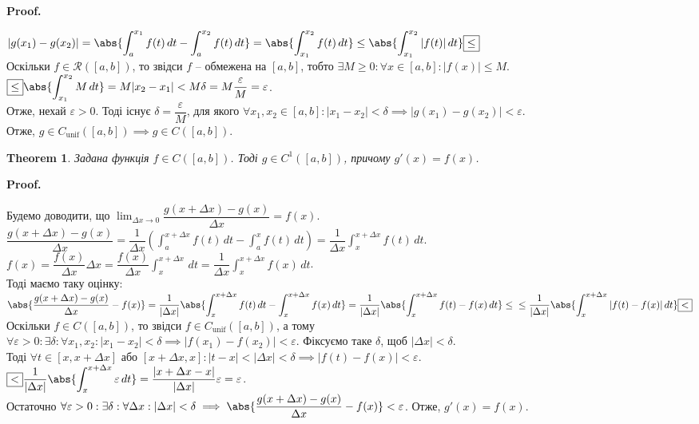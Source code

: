 \documentclass[a4paper, 10pt]{article}
\makeatletter
\def\huge{\displaystyle}
\theoremstyle{theoremdd}
\newtheorem{theorem}{Theorem}[subsection]
\theoremstyle{theoremdd}
\theoremstyle{theoremdd}
\theoremstyle{theoremdd}
\theoremstyle{theoremdd}
\theoremstyle{theoremdd}
\theoremstyle{theoremdd}
\theoremstyle{theoremdd}
\theoremstyle{theoremdd}
\renewenvironment{proof}[1][Proof.\\]{\par
\pushQED{\hfill \qed}%
\normalfont \topsep6\p@\@plus6\p@\relax
\trivlist
\item\relax
{\bfseries
#1\@addpunct{.}}\hspace\labelsep\ignorespaces
}{%
\popQED\endtrivlist\@endpefalse
}
\makeatother
\begin{document}
\begin{proof}
$|g(x_1)-g(x_2)| = \huge \abs{\int_a^{x_1} f(t)\,dt - \int_a^{x_2} f(t)\,dt} = \abs{\int_{x_1}^{x_2} f(t)\,dt} \leq \abs{\int_{x_1}^{x_2} |f(t)|\,dt} \boxed{\leq}$\\
Оскільки $f \in \mathcal{R}([a,b])$, то звідси $f$ -- обмежена на $[a,b]$, тобто $\exists M \geq 0: \forall x \in [a,b]: |f(x)| \leq M$.\\
$\boxed{\leq} \abs{\huge\int_{x_1}^{x_2} M \,dt} = M |x_2-x_1| < M \delta = M \dfrac{\varepsilon}{M} = \varepsilon$.\\
Отже, нехай $\varepsilon > 0$. Тоді існує $\delta = \dfrac{\varepsilon}{M}$, для якого $\forall x_1,x_2 \in [a,b]: |x_1-x_2| < \delta \implies |g(x_1)-g(x_2)| < \varepsilon$.\\
Отже, $g \in C_{\text{unif}}([a,b]) \implies g \in C([a,b])$.
\end{proof}

\begin{theorem}
Задана функція $f \in C([a,b])$. Тоді $g \in C^1([a,b])$, причому $g'(x) = f(x)$.
\end{theorem}

\begin{proof}
Будемо доводити, що $\huge\lim_{\Delta x \to 0} \dfrac{g(x+\Delta x) - g(x)}{\Delta x} = f(x)$.\\
$\dfrac{g(x+\Delta x)-g(x)}{\Delta x} = \dfrac{1}{\Delta x} \huge \left( \int_a^{x+\Delta x} f(t)\,dt - \int_a^x f(t)\,dt \right) = \dfrac{1}{\Delta x} \int_x^{x+\Delta x} f(t)\,dt$.\\
$f(x) = \dfrac{f(x)}{\Delta x} \Delta x = \dfrac{f(x)}{\Delta x} \huge\int_x^{x+\Delta x} \,dt = \dfrac{1}{\Delta x} \int_x^{x+\Delta x} f(x)\,dt$.\\
Тоді маємо таку оцінку:\\
$\huge \abs{\dfrac{g(x+\Delta x) - g(x)}{\Delta x} - f(x)} = \dfrac{1}{|\Delta x|} \abs{\int_x^{x+\Delta x} f(t)\,dt - \int_x^{x+\Delta x} f(x)\,dt} = \dfrac{1}{|\Delta x|} \abs{\int_x^{x+\Delta x} f(t)-f(x)\,dt} \leq \\ \leq \dfrac{1}{|\Delta x|} \abs{\int_x^{x+\Delta x} |f(t)-f(x)|\,dt} \boxed{<}$\\
Оскільки $f \in C([a,b])$, то звідси $f \in C_{\text{unif}}([a,b])$, а тому\\
$\forall \varepsilon > 0: \exists \delta: \forall x_1,x_2: |x_1-x_2| < \delta \implies |f(x_1)-f(x_2)| < \varepsilon$.
Фіксуємо таке $\delta$, щоб $|\Delta x| < \delta$.\\
Тоді $\forall t \in [x,x+\Delta x]$ або $[x+\Delta x,x]: |t-x| < |\Delta x| < \delta \implies |f(t)-f(x)| < \varepsilon$.\\
$\boxed{<} \dfrac{1}{|\Delta x|} \huge \abs{\int_x^{x+\Delta x} \varepsilon \,dt} = \dfrac{|x+\Delta x - x|}{|\Delta x|} \varepsilon = \varepsilon$.\\
Остаточно $\forall \varepsilon > 0: \exists \delta: \forall \Delta x: |\Delta x| < \delta \implies \abs{\dfrac{g(x+\Delta x) - g(x)}{\Delta x} - f(x)} < \varepsilon$. Отже, $g'(x) = f(x)$.
\end{proof}
\end{document}

